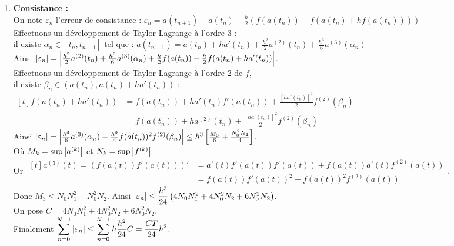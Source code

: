 \documentclass[12pt,a4paper]{article}
\begin{document}
	\begin{enumerate}
		\item \textbf{Consistance :}\\
		On note $\varepsilon_n$ l'erreur de consistance : $\varepsilon_n = a(t_{n+1}) - a(t_n) - \frac h2\left(f(a(t_n)) + f(a(t_n) + hf(a(t_n)))\right)$\\
		
		Effectuons un développement de Taylor-Lagrange à l'ordre 3 :\\
		il existe $\alpha_n \in [t_n,t_{n+1}]$ tel que : $a(t_{n+1}) = a(t_n) + h a'(t_n) + \frac {h^2}2 a^{(2)}(t_n) + \frac {h^3}{6} a^{(3)}(\alpha_n) $\\
		Ainsi $\left\lvert \varepsilon_n \right\rvert = \left\lvert  \frac{h^2}2a^{(2)}(t_n) + \frac{h^3}6a^{(3)}(\alpha_n) + \frac h2 f(a(t_n)) - \frac h2 f(a(t_n) + ha'(t_n)) \right\rvert$.\\
		
		Effectuons un développement de Taylor-Lagrange à l'ordre 2 de $f$,\\ il existe $\beta_n \in (a(t_n),a(t_n) + ha'(t_n))$ : $\begin{aligned}[t]
			f(a(t_n) + ha'(t_n)) &= f(a(t_n)) + ha'(t_n)f'(a(t_n)) + \frac{\left[ha'(t_n)\right]^2}2f^{(2)}(\beta_n)\\
			&= f(a(t_n)) + ha^{(2)}(t_n) + \frac{\left[ha'(t_n)\right]^2}2f^{(2)}(\beta_n)
		\end{aligned}$\\
		
		Ainsi $\left\lvert \varepsilon_n \right\rvert = \left\lvert \frac{h^3}{6}a^{(3)}(\alpha_n) - \frac{h^3}4f(a(t_n))^2f^{(2)}(\beta_n) \right\rvert \leq h^3\left[\frac{M_3}6 + \frac{N_0^2N_2}4\right]$.\\
		Où $M_k = \sup\left\lvert a^{(k)} \right\rvert$ et $N_k = \sup\left\lvert f^{(k)} \right\rvert$.\\
		Or $\begin{aligned}[t]
			a^{(3)}(t) = \left(f(a(t))f'(a(t))\right)' &= a'(t)f'(a(t))f'(a(t)) + f(a(t))a'(t)f^{(2)}(a(t)) \\
			&= f(a(t))f'(a(t))^2 + f(a(t))^2f^{(2)}(a(t))
		\end{aligned}$.\\
		Donc $M_3 \leq N_0N_1^2 + N_0^2N_2$. Ainsi $\left\lvert \varepsilon_n \right\rvert \leq \dfrac{h^3}{24}\left(4N_0N_1^2+4N_0^2N_2+6N_0^2N_2\right)$.\\
		On pose $C = 4N_0N_1^2+4N_0^2N_2+6N_0^2N_2$.\\
		
		Finalement $\displaystyle\sum_{n=0}^{N-1} \left\lvert \varepsilon_n \right\rvert \leq \sum_{n=0}^{N-1} h\frac{h^2}{24}C = \frac{CT}{24}h^2$.
		

\end{enumerate}
\end{document}

